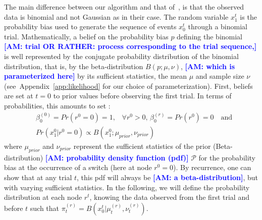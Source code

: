 \documentclass[12pt,english]{article}%
\newcommand{\eql}[1]{\begin{equation}#1\end{equation}}
\newcommand{\eqa}[1]{\begin{align}#1\end{align}}
\newcommand{\Pp}{\mathcal{P}}
\newcommand{\citep}[1]{\parencite{#1}}
\newcommand{\seeApp}[1]{Appendix~\ref{app:#1}}
\newcommand{\AM}[1]{\textbf{\textcolor{blue}{[AM: #1]}}}
\begin{document}
The main difference between our algorithm and that of~\citep{AdamsMackay2007},
is that the observed data is binomial and not Gaussian as in their case. 
The random variable $x_1^t$ is the probability bias used 
to generate the sequence of events $x_0^t$ through a binomial trial. 
Mathematically, a belief on the probability bias $p$ defining the binomial \AM{trial OR RATHER: process corresponding to the trial sequence,} 
is well represented by the conjugate probability distribution of the binomial distribution,
that is, by the beta-distribution $B(p; \mu, \nu)$, 
\AM{which is parameterized here} by its sufficient statistics,
the mean $\mu$ and sample size $\nu$
(see~\seeApp{likelihood} for our choice of parameterization).
First, beliefs are set at $t=0$ to prior values before observing the first trial.
In terms of probabilities, this amounts to set :
\eqa{
& \beta^{(0)}_0=Pr(r^0=0)=1 \text{,}\quad \forall r^0>0 \text{, } \beta^{(r)}_0=Pr(r^0)=0 \quad \text{and} \\
& Pr(x_1^0 | r^0=0) \propto B(x_1^0; \mu_{prior}, \nu_{prior})
}
where $\mu_{prior}$ and $\nu_{prior}$ represent the sufficient statistics 
of the prior (Beta-distribution) \AM{probability density function (pdf)} $\Pp$
for the probability bias 
at the occurrence of a switch (here at node $r^0=0$).
By recurrence, one can show that at any trial $t$, 
this pdf will always be \AM{a beta-distribution}, 
but with varying sufficient statistics.
In the following, we will define the probability distribution at each node $r^t$, 
knowing the data observed from the first trial and before $t$ such that 
$
\pi^{(r)}_t = B( x_0^t |  \mu^{(r)}_{t}, \nu^{(r)}_{t}) 
$. %
\end{document}
